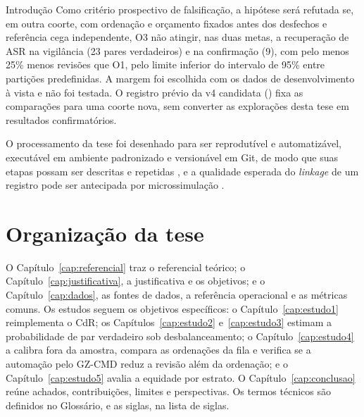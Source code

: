 \begin{chapter}{Introdução}
Como critério prospectivo de falsificação, a hipótese será refutada se, em outra coorte, com ordenação e orçamento fixados antes dos desfechos e referência cega independente, O3 não atingir, nas duas metas, a recuperação de ASR na vigilância (23 pares verdadeiros) e na confirmação (9), com pelo menos 25\% menos revisões que O1, pelo limite inferior do intervalo de 95\% entre partições predefinidas. A margem foi escolhida com os dados de desenvolvimento à vista e não foi testada. O registro prévio da v4 candidata () fixa as comparações para uma coorte nova, sem converter as explorações desta tese em resultados confirmatórios.

O processamento da tese foi desenhado para ser reprodutível e automatizável, executável em ambiente padronizado e versionável em Git, de modo que suas etapas possam ser descritas e repetidas \cite{Asher2020introduction}, e a qualidade esperada do \textit{linkage} de um registro pode ser antecipada por microssimulação \cite{Schnell2023microsimulation}.

\section{Organização da tese}\label{sec:organizacao-tese}

O Capítulo~\ref{cap:referencial} traz o referencial teórico; o Capítulo~\ref{cap:justificativa}, a justificativa e os objetivos; e o Capítulo~\ref{cap:dados}, as fontes de dados, a referência operacional e as métricas comuns. Os estudos seguem os objetivos específicos: o Capítulo~\ref{cap:estudo1} reimplementa o CdR; os Capítulos~\ref{cap:estudo2} e~\ref{cap:estudo3} estimam a probabilidade de par verdadeiro sob desbalanceamento; o Capítulo~\ref{cap:estudo4} a calibra fora da amostra, compara as ordenações da fila e verifica se a automação pelo GZ-CMD reduz a revisão além da ordenação; e o Capítulo~\ref{cap:estudo5} avalia a equidade por estrato. O Capítulo~\ref{cap:conclusao} reúne achados, contribuições, limites e perspectivas. Os termos técnicos são definidos no Glossário, e as siglas, na lista de siglas.

\end{chapter}
